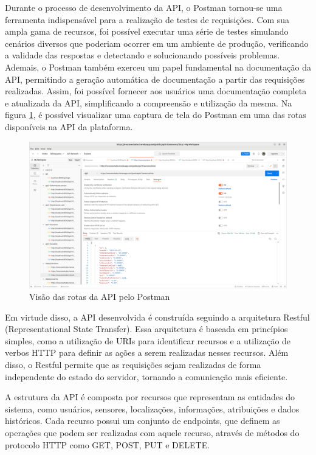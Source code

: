 \documentclass[tcc,capa]{texufpel}
\begin{document}
Durante o processo de desenvolvimento da API, o Postman \cite{Postman:2023} tornou-se uma ferramenta indispensável para a realização de testes de requisições. Com sua ampla gama de recursos, foi possível executar uma série de testes simulando cenários diversos que poderiam ocorrer em um ambiente de produção, verificando a validade das respostas e detectando e solucionando possíveis problemas. Ademais, o Postman também exerceu um papel fundamental na documentação da API, permitindo a geração automática de documentação a partir das requisições realizadas. Assim, foi possível fornecer aos usuários uma documentação completa e atualizada da API, simplificando a compreensão e utilização da mesma. Na figura \ref{postman}, é possível visualizar uma captura de tela do Postman em uma das rotas disponíveis na API da plataforma.
\begin{figure}[htbp]
\centering \includegraphics[scale=.25]{assets/postman.png}
\caption{Visão das rotas da API pelo Postman}
\label{postman}
\end{figure}
\newpage

Em virtude disso, a API desenvolvida é construída seguindo a arquitetura Restful (Representational State Transfer). Essa arquitetura é baseada em princípios simples, como a utilização de URIs para identificar recursos e a utilização de verbos HTTP para definir as ações a serem realizadas nesses recursos. Além disso, o Restful permite que as requisições sejam realizadas de forma independente do estado do servidor, tornando a comunicação mais eficiente.

A estrutura da API é composta por recursos que representam as entidades do sistema, como usuários, sensores, localizações, informações, atribuições e dados históricos. Cada recurso possui um conjunto de endpoints, que definem as operações que podem ser realizadas com aquele recurso, através de métodos do protocolo HTTP como GET, POST, PUT e DELETE.
\end{document}
